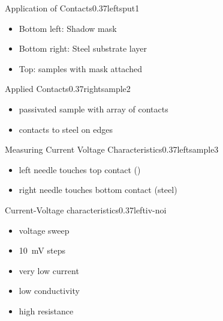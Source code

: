 \documentclass[hyperref={pdfpagelabels=false}, aspectratio=43, t]{beamer}  %
\begin{document}
\begin{graphicsFrame}{Application of Contacts}{}{0.37}{left}{sput1}{}
		\begin{itemize}
			\item Bottom left: Shadow mask
			\item Bottom right: Steel substrate  layer
			\item Top: samples with mask attached
		\end{itemize}
\end{graphicsFrame}
%
\begin{graphicsFrame}{Applied Contacts}{}{0.37}{right}{sample2}{}
	\vspace{1em}
		\begin{itemize}
			\item passivated sample with array of contacts
				\vspace{.5em}
			\item contacts to steel on edges
		\end{itemize}
\end{graphicsFrame}
%
\begin{graphicsFrame}{Measuring Current Voltage Characteristics}{}{0.37}{left}{sample3}{}
	\vspace{3em}
		\begin{itemize}
			\item left needle touches top contact ()
				\vspace{1.5em}
			\item right needle touches bottom contact (steel)
		\end{itemize}
\end{graphicsFrame}

\begin{graphicsFrame}{Current-Voltage characteristics}{}{0.37}{left}{iv-noi}{}
	\vspace{2em}
	\begin{itemize}
		\item voltage sweep
		\vspace{.5em}
		\item 10\SI{}{\milli\volt} steps
		\vspace{.5em}
		\item very low current 
		\vspace{.5em}
		\item low conductivity 
		\vspace{.5em}
		\item high resistance 
	\end{itemize}
\end{graphicsFrame}
\end{document}
